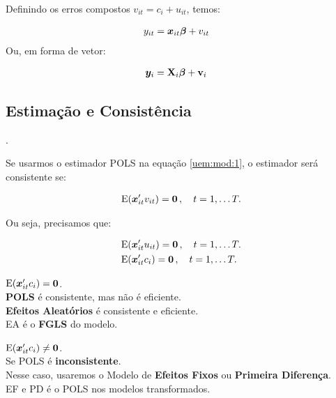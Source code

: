 \documentclass[11pt, oneside, a4paper, article]{article}
\numberwithin{equation}{section}
\begin{document}
\vspace{1 em}
\noindent
Definindo os erros compostos $v_{it} = c_{i} + u_{it}$, temos:

\vspace{-1 em}
\begin{align}\label{uem:mod:2}
	y_{it} &= \boldsymbol{x}_{it} \boldsymbol{\beta} + v_{it}
\end{align}
Ou, em forma de vetor:

\vspace{-1 em}
\begin{align}\label{uem:mod:vec}
	\boldsymbol{y}_{i} &= \mathbf{X}_{i} \boldsymbol{\beta} + \mathbf{v}_{i}
\end{align}

\subsection{Estimação e Consistência}
\noindent
\citet[Sec.10.3 -- Estimating UEM by POLS, p.256]{wool-2010}.

\vspace{1 em}
Se usarmos o estimador POLS na equação \eqref{uem:mod:1}, o estimador será consistente se:

\vspace{-1 em}
\begin{align*}
	\text{E}(\boldsymbol{x}_{it}' v_{it}) = \boldsymbol{0} \, , \quad t=1, \dots T.
\end{align*}

Ou seja, precisamos que:

\vspace{-1 em}
\begin{align*}
	& 
	\text{E}(\boldsymbol{x}_{it}' u_{it}) = \boldsymbol{0} \, , \quad t=1, \dots T.
	\\
	&
	\text{E}(\boldsymbol{x}_{it}' c_{i}) = \boldsymbol{0} \, , \quad t=1, \dots T.
\end{align*}

\begin{description}[]
	\item [Caso 1:] $\text{E}(\boldsymbol{x}_{it}' c_{i}) = \boldsymbol{0}$. \\
		\textbf{POLS} é consistente, mas não é eficiente.\\
		\textbf{Efeitos Aleatórios} é consistente e eficiente.\\
		EA é o \textbf{FGLS}  do modelo.

	\item [Caso 2:] $\text{E}(\boldsymbol{x}_{it}' c_{i}) \neq \boldsymbol{0}$. \\
		Se POLS é \textbf{inconsistente}. \\
		Nesse caso, usaremos o Modelo de \textbf{Efeitos Fixos} ou \textbf{Primeira Diferença}. \\
		EF e PD é o POLS nos modelos transformados.
\end{description}
\end{document}
